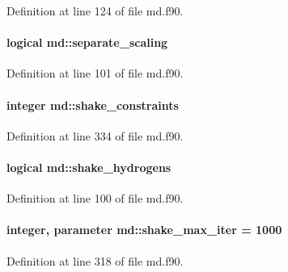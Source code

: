 Definition at line 124 of file md.\-f90.

\hypertarget{classmd_af2cad0f016d5428317b00d47a28127f5}{
\paragraph[{separate\-\_\-scaling}]{\setlength{\rightskip}{0pt plus 5cm}logical md\-::separate\-\_\-scaling}}\label{classmd_af2cad0f016d5428317b00d47a28127f5}


Definition at line 101 of file md.\-f90.

\hypertarget{classmd_a99577f63ed7ff20cb8547fc842f3abed}{
\paragraph[{shake\-\_\-constraints}]{\setlength{\rightskip}{0pt plus 5cm}integer md\-::shake\-\_\-constraints}}\label{classmd_a99577f63ed7ff20cb8547fc842f3abed}


Definition at line 334 of file md.\-f90.

\hypertarget{classmd_a7b64b925ddde9dba048509b4f3cf9cd9}{
\paragraph[{shake\-\_\-hydrogens}]{\setlength{\rightskip}{0pt plus 5cm}logical md\-::shake\-\_\-hydrogens}}\label{classmd_a7b64b925ddde9dba048509b4f3cf9cd9}


Definition at line 100 of file md.\-f90.

\hypertarget{classmd_a3f9ba2f45bcb22883b562a1a5d6e0d8d}{
\paragraph[{shake\-\_\-max\-\_\-iter}]{\setlength{\rightskip}{0pt plus 5cm}integer, parameter md\-::shake\-\_\-max\-\_\-iter = 1000}}\label{classmd_a3f9ba2f45bcb22883b562a1a5d6e0d8d}


Definition at line 318 of file md.\-f90.

